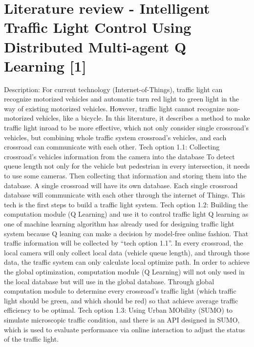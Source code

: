 \documentclass[draftclsnofoot,onecolumn]{IEEEtran}
\begin{document}
\section{Literature review - Intelligent Traffic Light Control Using Distributed Multi-agent Q Learning [1]}
 Description: For current technology (Internet-of-Things), traffic light can recognize motorized vehicles and automatic turn red light to green light in the way of existing motorized vehicles. However, traffic light cannot recognize non-motorized vehicles, like a bicycle. In this literature, it describes a method to make traffic light inroad to be more effective, which not only consider single crossroad’s vehicles, but combining whole traffic system crossroad’s vehicles, and each crossroad can communicate with each other.
 \newline
Tech option 1.1: Collecting crossroad’s vehicles information from the camera into the database
To detect queue length not only for the vehicle but pedestrian in every intersection, it needs to use some cameras.  Then collecting that information and storing them into the database. A single crossroad will have its own database. Each single crossroad database will communicate with each other through the internet of Things. This tech is the first steps to build a traffic light system.
 \newline
Tech option 1.2: Building the computation module (Q Learning) and use it to control traffic light
Q learning as one of machine learning algorithm has already used for designing traffic light system because Q leaning can make a decision by model-free online fashion. That traffic information will be collected by “tech option 1.1”. In every crossroad, the local camera will only collect local data (vehicle queue length), and through those data, the traffic system can only calculate local optimize path. In order to achieve the global optimization, computation module (Q Learning) will not only used in the local database but will use in the global database. Through global computation module to determine every crossroad’s traffic light (which traffic light should be green, and which should be red) so that achieve average traffic efficiency to be optimal.
\newline
Tech option 1.3: Using Urban MObility (SUMO) to simulate microscopic traffic condition, and there is an API designed in SUMO, which is used to evaluate performance via online interaction to adjust the status of the traffic light.
\end{document}

